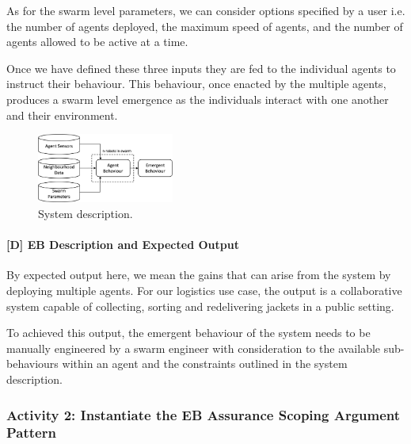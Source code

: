 \documentclass[lettersize,journal]{IEEEtran}
\begin{document}
As for the swarm level parameters, we can consider options specified by a user i.e. the number of agents deployed, the maximum speed of agents, and the number of agents allowed to be active at a time.

Once we have defined these three inputs they are fed to the individual agents to instruct their behaviour. This behaviour, once enacted by the multiple agents, produces a swarm level emergence as the individuals interact with one another and their environment.

\begin{figure}
	\centering
	\includegraphics[width=0.4\textwidth]{figures/stage1-systema.png}
	\caption{System description.}
	\label{system-description}
\end{figure}

\paragraph*{[D] EB Description and Expected Output}
By expected output here, we mean the gains that can arise from the system by deploying multiple agents.
For our logistics use case, the output is a collaborative system capable of collecting, sorting and redelivering jackets in a public setting. 

To achieved this output, the emergent behaviour of the system needs to be manually engineered by a swarm engineer with consideration to the available sub-behaviours within an agent and the constraints outlined in the system description.
%

%
\subsubsection*{Activity 2: Instantiate the EB Assurance Scoping Argument Pattern}
\end{document}
